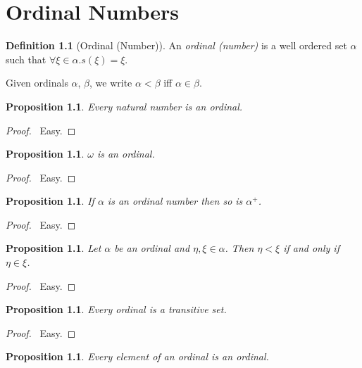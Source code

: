 \documentclass{report}
\let\qed\relax
\newtheorem{prop}[ax]{Proposition}
\theoremstyle{definition}
\newtheorem{df}[ax]{Definition}
\begin{document}
\chapter{Ordinal Numbers}

\begin{df}[Ordinal (Number)]
An \emph{ordinal (number)} is a well ordered set $\alpha$ such that $\forall \xi \in \alpha. s(\xi) = \xi$.

Given ordinals $\alpha$, $\beta$, we write $\alpha < \beta$ iff $\alpha \in \beta$.
\end{df}

\begin{prop}
Every natural number is an ordinal.
\end{prop}

\begin{proof}
\pf\ Easy. \qed
\end{proof}

\begin{prop}
$\omega$ is an ordinal.
\end{prop}

\begin{proof}
\pf\ Easy. \qed
\end{proof}

\begin{prop}
If $\alpha$ is an ordinal number then so is $\alpha^+$.
\end{prop}

\begin{proof}
\pf\ Easy. \qed
\end{proof}

\begin{prop}
Let $\alpha$ be an ordinal and $\eta, \xi \in \alpha$. Then $\eta < \xi$ if and only if $\eta \in \xi$.
\end{prop}

\begin{proof}
\pf\ Easy. \qed
\end{proof}

\begin{prop}
Every ordinal is a transitive set.
\end{prop}

\begin{proof}
\pf\ Easy. \qed
\end{proof}

\begin{prop}
Every element of an ordinal is an ordinal.
\end{prop}
\end{document}
